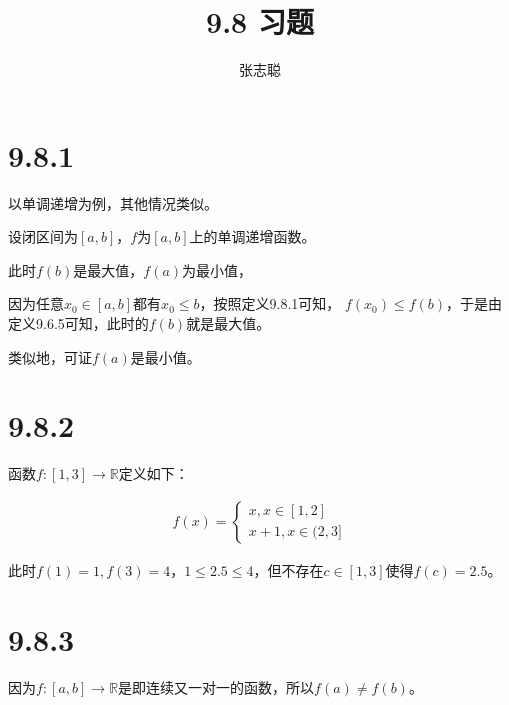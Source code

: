 \documentclass{article}
\begin{document}
\title{9.8 习题}
\author{张志聪}
\maketitle

\section*{9.8.1}

以单调递增为例，其他情况类似。

设闭区间为$[a, b]$，$f$为$[a, b]$上的单调递增函数。

此时$f(b)$是最大值，$f(a)$为最小值，

因为任意$x_0 \in [a, b]$都有$x_0 \leq b$，按照定义9.8.1可知，
$f(x_0) \leq f(b)$，于是由定义9.6.5可知，此时的$f(b)$就是最大值。

类似地，可证$f(a)$是最小值。

\section*{9.8.2}

函数$f: [1, 3] \to \mathbb{R}$定义如下：

\begin{eqnarray*}
      f(x) =
      \begin{cases*}
            x, x \in [1, 2] \\
            x+1, x \in (2,3]
      \end{cases*}
\end{eqnarray*}

此时$f(1) = 1, f(3) = 4$，$1 \leq 2.5 \leq 4$，但不存在$c \in [1, 3]$使得$f(c) = 2.5$。

\section*{9.8.3}

因为$f: [a, b] \to \mathbb{R}$是即连续又一对一的函数，所以$f(a) \neq f(b)$。
\end{document}
